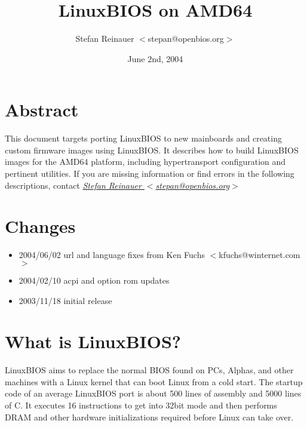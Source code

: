 \documentclass[titlepage,12pt]{article}
\title{LinuxBIOS on AMD64}
\author{Stefan Reinauer $<$stepan@openbios.org$>$}
\date{June 2nd, 2004}
\begin{document}
\maketitle

\thispagestyle{empty}                                                           

\tableofcontents

\newpage

%
%

\section{Abstract}

This document targets porting LinuxBIOS to new mainboards and creating
custom firmware images using LinuxBIOS. It describes how to build
LinuxBIOS images for the AMD64 platform, including hypertransport
configuration and pertinent utilities. If you are missing information or
find errors in the following descriptions, contact
\href{mailto:stepan@openbios.org}{\textit{Stefan Reinauer $<$stepan@openbios.org$>$}}


%
%

\section{Changes}
 \begin{itemize}
 \item 2004/06/02 url and language fixes from Ken Fuchs $<$kfuchs@winternet.com$>$
 \item 2004/02/10 acpi and option rom updates
 \item 2003/11/18 initial release 
 \end{itemize}



%
%

\section{What is LinuxBIOS?}

LinuxBIOS aims to replace the normal BIOS found on PCs, Alphas, and
other machines with a Linux kernel that can boot Linux from a cold
start. The startup code of an average LinuxBIOS port is about 500 lines
of assembly and 5000 lines of C. It executes 16 instructions to get into
32bit mode and then performs DRAM and other hardware initializations
required before Linux can take over.
\end{document}
